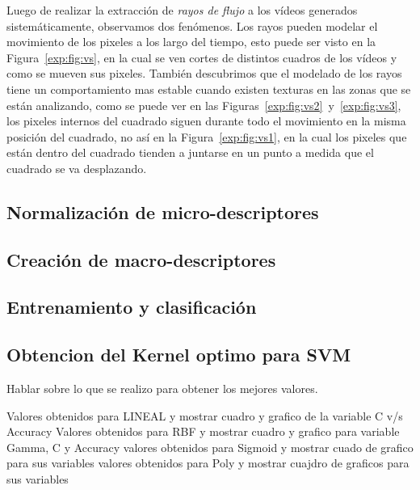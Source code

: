 Luego de realizar la extracción de \textit{rayos de flujo} a los vídeos generados sistemáticamente, observamos dos fenómenos. Los rayos pueden modelar el movimiento de los pixeles a los largo del tiempo, esto puede ser visto en la Figura~\ref{exp:fig:vs}, en la cual se ven cortes de distintos cuadros de los vídeos y como se mueven sus pixeles. También descubrimos que el modelado de los rayos tiene un comportamiento mas estable cuando existen texturas en las zonas que se están analizando, como se puede ver en las Figuras~\ref{exp:fig:vs2}~y~\ref{exp:fig:vs3}, los pixeles internos del cuadrado siguen durante todo el movimiento en la misma posición del cuadrado, no así en la Figura~\ref{exp:fig:vs1}, en la cual los pixeles que están dentro del cuadrado tienden a juntarse en un punto a medida que el cuadrado se va desplazando.


\subsection{ Normalización de micro-descriptores}


\subsection{ Creación de macro-descriptores}


\subsection{ Entrenamiento y clasificación}




\subsection{Obtencion del Kernel optimo para SVM}

Hablar sobre lo que se realizo para obtener los mejores valores.

Valores obtenidos para LINEAL y mostrar cuadro y grafico de la variable C v/s Accuracy
Valores obtenidos para RBF y mostrar cuadro y grafico para variable Gamma, C y Accuracy
valores obtenidos para Sigmoid y mostrar cuado de grafico para sus variables
valores obtenidos para Poly y mostrar cuajdro de graficos para sus variables

